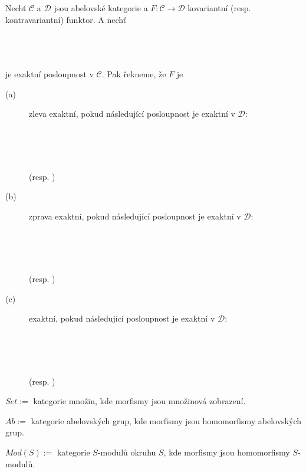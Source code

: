     \begin{dfn}
      Nechť $\mathcal C$ a $\mathcal D$ jsou abelovské kategorie a $F:\mathcal C\to\mathcal D$ 
      kovariantní (resp. kontravariantní) funktor. A nechť  \\\\
            \centerline{}\\\\ je exaktní posloupnost v $\mathcal C$. Pak řekneme, že $F$ je
      \begin{description}
        \item[(a)] zleva exaktní, pokud následující posloupnost je exaktní v $\mathcal D$:\\\\
            \centerline{}\\\\
             \centerline{(resp. )}
        \item[(b)] zprava exaktní, pokud následující posloupnost je exaktní v $\mathcal D$:\\\\
            \centerline{}\\\\
             \centerline{(resp. )}
        \item[(c)] exaktní, pokud následující posloupnost je exaktní v $\mathcal D$:\\\\
            \centerline{}\\\\
             \centerline{(resp. )}
      \end{description}
    \end{dfn}
    
    \begin{dfn}
      \begin{description}
        \item
        \item[(a)] $Set:=$ kategorie množin, kde morfismy jsou množinová 
        zobrazení.
        \item[(b)] $Ab:=$ kategorie abelovských grup, kde 
        morfismy jsou homomorfismy abelovských grup. 
        \item[(c)] $Mod(S):=$ kategorie $S$-modulů okruhu $S$, kde morfismy jsou 
        homomorfismy $S$-modulů.
      \end{description}
    \end{dfn}
    
